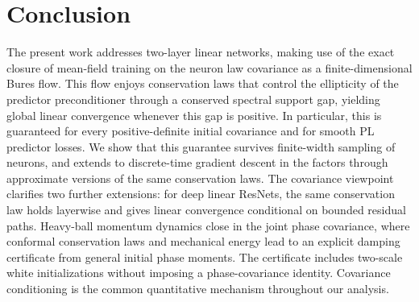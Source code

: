 \section{Conclusion}
The present work addresses two-layer linear networks, making use of the exact closure of mean-field training on the neuron law covariance as a finite-dimensional Bures flow.
This flow enjoys conservation laws that control the ellipticity of the predictor preconditioner through a conserved spectral support gap, yielding global linear convergence whenever this gap is positive.
In particular, this is guaranteed for every positive-definite initial covariance and for smooth PL predictor losses. 
We show that this guarantee survives finite-width sampling of neurons, and extends to discrete-time gradient descent in the factors through approximate versions of the same conservation laws.
The covariance viewpoint clarifies two further extensions: for deep linear ResNets, the same conservation law holds layerwise and gives linear convergence conditional on bounded residual paths.
Heavy-ball momentum dynamics close in the joint phase covariance, where conformal conservation laws and mechanical energy lead to an explicit damping certificate from general initial phase moments.
The certificate includes two-scale white initializations without imposing a phase-covariance identity. Covariance conditioning is the common quantitative mechanism throughout our analysis.

